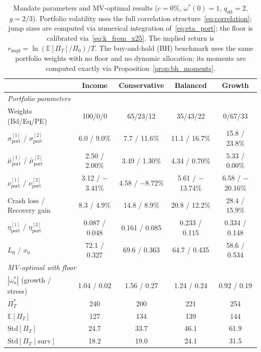 \documentclass[11pt,a4paper]{article}
\numberwithin{equation}{section}
\newcommand{\E}{\mathbb{E}}
\begin{document}
\begin{table}[H]
\centering
\caption{Mandate parameters and MV-optimal results ($c = 0\%$, 
$\omega^*(0) = 1$, $q_{\mathrm{dd}} = 2$, $g = 2/3$). 
Portfolio volatility uses the full correlation 
structure~\eqref{eq:correlation}; jump sizes are computed via numerical 
integration of~\eqref{eq:eta_port}; the floor is calibrated 
via~\eqref{eq:k_from_x25}. The implied return is 
$r_{\mathrm{impl}} = \ln(\E[\Pi_T]/\Pi_0)/T$.
The buy-and-hold (BH) benchmark uses the same portfolio weights 
with no floor and no dynamic allocation; its moments are computed exactly via Proposition~\ref{prop:bh_moments}.}
\label{tab:mandates}
\small
\begin{tabular}{lcccc}
\toprule
& \textbf{Income} & \textbf{Conservative} & \textbf{Balanced} 
& \textbf{Growth} \\
\midrule
\multicolumn{5}{l}{\textit{Portfolio parameters}} \\
Weights (Bd/Eq/PE) & 100/0/0 & 65/23/12 & 35/43/22 & 0/67/33 \\
$\sigma^{[1]}_{\mathrm{port}}$ / $\sigma^{[2]}_{\mathrm{port}}$ 
  & 6.0 / 9.0\% & 7.7 / 11.6\% & 11.1 / 16.7\% & 15.8 / 23.8\% \\
$\bar{\mu}^{[1]}_{\mathrm{port}}$ / $\bar{\mu}^{[2]}_{\mathrm{port}}$ 
  & 2.50 / 2.00\% & 3.49 / 1.30\% & 4.34 / 0.70\% & 5.33 / 0.00\% \\
$\nu^{[1]}_{\mathrm{port}}$ / $\nu^{[2]}_{\mathrm{port}}$ 
  & 3.12 / $-$3.41\% & 4.58 / $-$8.72\% & 5.61 / $-$13.74\% & 6.58 / $-$20.16\% \\
Crash loss / Recovery gain 
  & 8.3 / 4.9\% & 14.8 / 8.9\% & 20.8 / 12.2\% & 28.4 / 15.9\% \\
$\eta^{[1]}_{\mathrm{port}}$ / $\eta^{[2]}_{\mathrm{port}}$ 
  & 0.087 / 0.048 & 0.161 / 0.085 & 0.233 / 0.115 & 0.334 / 0.148 \\
$L_{0}$ / $x_0$ 
  & 72.1 / 0.327 & 69.6 / 0.363 & 64.7 / 0.435 & 58.6 / 0.534 \\
\midrule
\multicolumn{5}{l}{\textit{MV-optimal with floor}} \\
$|\omega^*_a|$ (growth / stress) 
  & 1.04 / 0.02 & 1.56 / 0.27 & 1.24 / 0.24 & 0.92 / 0.19 \\
$\Pi^*_T$ & 240 & 200 & 221 & 254 \\
$\E[\Pi_T]$ & 127 & 134 & 139 & 144 \\
$\mathrm{Std}[\Pi_T]$ & 24.7 & 33.7 & 46.1 & 61.9 \\
$\mathrm{Std}[\Pi_T \mid \mathrm{surv}]$ & 18.2 & 19.0 & 24.1 & 31.5 \\

\end{tabular}
\end{table}
\end{document}
